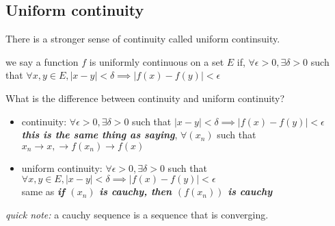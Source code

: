 \documentclass{article}
\begin{document}
\subsection{Uniform continuity} 
There is a stronger sense of continuity called uniform continsuity. 
\begin{definition}
    we say a function $f$ is uniformly continuous on a set $E$ if, $\forall \epsilon > 0, \exists \delta > 0$ such that $ \forall x, y \in E, 
    |x - y| < \delta \implies |f(x) - f(y)| < \epsilon$
\end{definition}
What is the difference between continuity and uniform continuity? 
\begin{itemize}
    \item continuity: $\forall \epsilon > 0, \exists \delta > 0$ such that $|x - y| < \delta \implies |f(x) - f(y)| < \epsilon$ \\ \textbf{\textit{this is the same thing as saying}}, $\forall (x_n)$ such that $x_n \to x, \rightarrow f(x_n) \rightarrow f(x)$
    \item uniform continuity: $\forall \epsilon > 0, \exists \delta > 0$ such that $ \forall x, y \in E, 
    |x - y| < \delta \implies |f(x) - f(y)| < \epsilon$ \\ same as \textbf{\textit{if $(x_n)$ is cauchy, then $(f(x_n))$ is cauchy}}
    
\end{itemize}
\textit{quick note:} a cauchy sequence is a sequence that is converging. 
\end{document}
